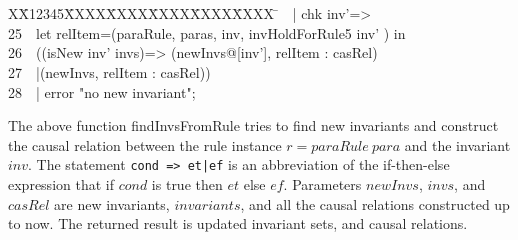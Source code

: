 \documentclass{llncs}
\newlength{\fminilength}
\newenvironment{fmini}[1][\linewidth]
  {\setlength{\fminilength}{#1\fboxsep-2\fboxrule}%
   \vspace{2ex}\noindent\begin{lrbox}{\fminibox}\begin{minipage}{\fminilength}%
   \mbox{ }\hfill\vspace{-2.5ex}}%
  {\end{minipage}\end{lrbox}\vspace{1ex}\hspace{0ex}%
   \framebox{\usebox{\fminibox}}}
\newenvironment{specification}
{\noindent\scriptsize \tt\begin{fmini}\begin{tabbing}X\=X12345\=XXXX\=XXXX\=XXXX\=XXXX\=XXXX
\=\+\kill} {\end{tabbing}\normalfont\end{fmini}}
\def \twoSpaces {\ \ }
\begin{document}
\begin{specification}
24\twoSpaces   | chk inv'=>\\
25\twoSpaces      let relItem=(paraRule, paras, inv,  invHoldForRule5 inv'  ) in\\
26\twoSpaces        ((isNew inv' invs)=>        (newInvs@[inv'], relItem : casRel)\\
27\twoSpaces        |(newInvs,  relItem : casRel))\\
28\twoSpaces   | error "no new invariant";\\
\end{specification}

The above function {\sf findInvsFromRule} tries to find new invariants and construct the causal relation between the rule instance $r=paraRule~ para$ and
 the invariant $inv$. The statement { \tt cond => et|ef} is an abbreviation of the if-then-else expression that if $cond$ is true then $et$ else $ef$. Parameters  $newInvs$, $invs$, and  $casRel$ are new invariants,  $invariants$, and all the causal relations constructed up to now. The returned result is updated invariant sets, and causal relations.
\end{document}

